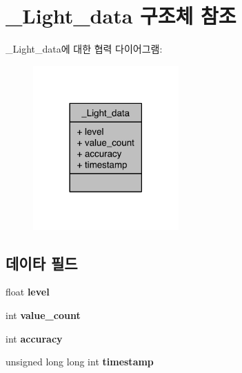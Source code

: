 \hypertarget{struct___light__data}{\section{\-\_\-\-Light\-\_\-data 구조체 참조}
\label{struct___light__data}
}


\-\_\-\-Light\-\_\-data에 대한 협력 다이어그램\-:\nopagebreak
\begin{figure}[H]
\begin{center}
\leavevmode
\includegraphics[width=158pt]{d6/d02/struct___light__data__coll__graph}
\end{center}
\end{figure}
\subsection*{데이타 필드}
\begin{DoxyCompactItemize}
\item 
\hypertarget{struct___light__data_a450c3ab9b94a4663caad892b7193b547}{float {\bfseries level}}\label{struct___light__data_a450c3ab9b94a4663caad892b7193b547}

\item 
\hypertarget{struct___light__data_a40a079bfc72408819dc78da308203a74}{int {\bfseries value\-\_\-count}}\label{struct___light__data_a40a079bfc72408819dc78da308203a74}

\item 
\hypertarget{struct___light__data_a5565cf9073275f9713f9016e7c10d25f}{int {\bfseries accuracy}}\label{struct___light__data_a5565cf9073275f9713f9016e7c10d25f}

\item 
\hypertarget{struct___light__data_a8de02c4128636a7bf630ff5428f60c8d}{unsigned long long int {\bfseries timestamp}}\label{struct___light__data_a8de02c4128636a7bf630ff5428f60c8d}

\end{DoxyCompactItemize}


